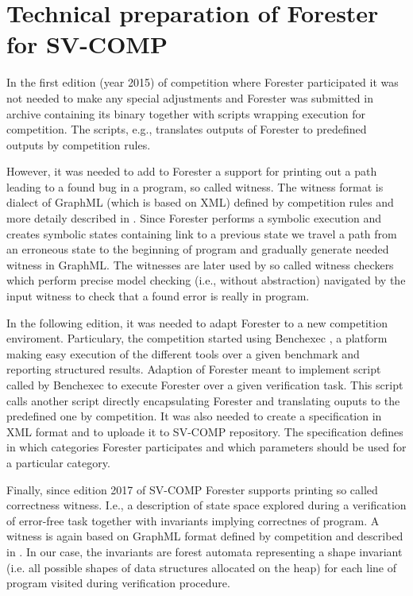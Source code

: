 {\section{Technical preparation of Forester for SV-COMP}
In the first edition (year 2015) \cite{svcomp15-forester} of competition where Forester participated it was not
needed to make any special adjustments and Forester was submitted in archive containing its binary together
with scripts wrapping execution for competition.
The scripts, e.g., translates outputs of Forester to predefined outputs by competition rules.

However, it was needed to add to Forester a support for printing out a path leading to a found bug in a program,
so called witness.
The witness format is dialect of GraphML (which is based on XML) defined by competition rules and more detaily described in \cite{fse15-witness}.
Since Forester performs a symbolic execution and creates symbolic states containing link to a previous state
we travel a path from an erroneous state to the beginning of program and gradually generate needed witness in GraphML.
The witnesses are later used by so called witness checkers which perform precise model checking (i.e., without abstraction)
navigated by the input witness to check that a found error is really in program.

In the following edition, it was needed to adapt Forester to a new competition enviroment.
Particulary, the competition started using Benchexec \cite{sttt-benchexec}, a platform
making easy execution of the different tools over a given benchmark and reporting structured results.
Adaption of Forester meant to implement script called by Benchexec to execute Forester over a given 
verification task.
This script calls another script directly encapsulating Forester and translating ouputs to the predefined
one by competition.
It was also needed to create a specification in XML format and to uploade it to SV-COMP repository.
The specification defines in which categories Forester participates and which parameters should be used
for a particular category.

Finally, since edition 2017 of SV-COMP Forester supports printing so called correctness witness.
I.e., a description of state space explored during a verification of error-free task together with
invariants implying correctnes of program.
A witness is again based on GraphML format defined by competition and described in \cite{fse16-correct}.
In our case, the invariants are forest automata representing a shape invariant (i.e. all possible shapes of data structures
allocated on the heap) for each line of program visited during verification procedure.

}
